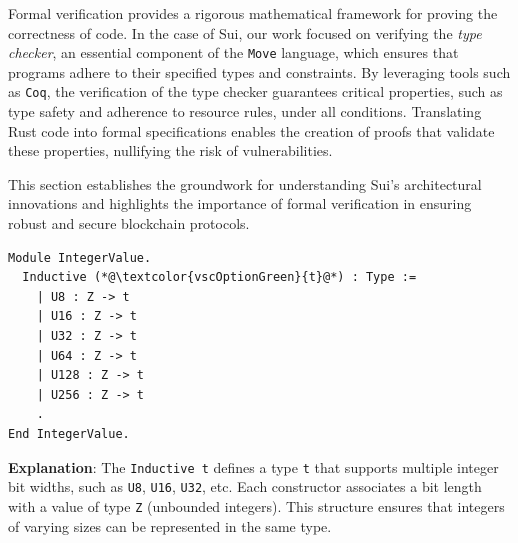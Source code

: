 \documentclass[english, 12pt, a4paper, biz, utf8, a-2b, online]{aaltothesis}
\begin{document}
Formal verification provides a rigorous mathematical framework for proving the correctness of code. In the case of Sui, our work focused on verifying the \emph{type checker}, an essential component of the \texttt{Move} language, which ensures that programs adhere to their specified types and constraints. By leveraging tools such as \texttt{Coq}, the verification of the type checker guarantees critical properties, such as type safety and adherence to resource rules, under all conditions. Translating Rust code into formal specifications enables the creation of proofs that validate these properties, nullifying the risk of vulnerabilities.

This section establishes the groundwork for understanding Sui's architectural innovations and highlights the importance of formal verification in ensuring robust and secure blockchain protocols.

\begin{tcolorbox}[
  colback=white,     %
  colframe=white,    %
  boxrule=0pt,       %
  sharp corners,     %
  boxsep=0pt,        %
  left=0pt,          %
  right=0pt,         %
  top=0pt,           %
  bottom=0pt         %
]
\begin{lstlisting}[caption={Definition of the Inductive Type \texttt{t}},captionpos=b]
Module IntegerValue.
  Inductive (*@\textcolor{vscOptionGreen}{t}@*) : Type :=
    | U8 : Z -> t
    | U16 : Z -> t
    | U32 : Z -> t
    | U64 : Z -> t
    | U128 : Z -> t
    | U256 : Z -> t
    .
End IntegerValue.
\end{lstlisting}
\end{tcolorbox}

\textbf{Explanation}: The \texttt{Inductive t} defines a type \texttt{t} that supports multiple integer bit widths, such as \texttt{U8}, \texttt{U16}, \texttt{U32}, etc. Each constructor associates a bit length with a value of type \texttt{Z} (unbounded integers). This structure ensures that integers of varying sizes can be represented in the same type.
\end{document}
